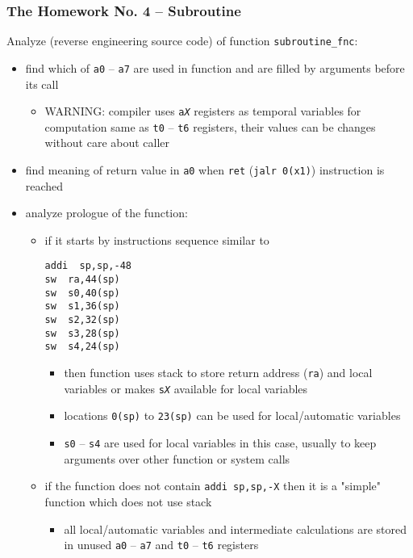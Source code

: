 \documentclass{beamer}
\begin{document}
\begin{frame}[fragile,shrink=20]
\frametitle{The Homework No. 4 -- Subroutine}

Analyze (reverse engineering source code) of function \texttt{subroutine\_fnc}:
\begin{itemize}
\item find which of \texttt{a0} -- \texttt{a7} are used in function and are filled by arguments before its call
 \begin{itemize}
 \item WARNING: compiler uses \texttt{a\textit{X}} registers as temporal variables for computation same as \texttt{t0} -- \texttt{t6} registers, their values can be changes without care about caller
 \end{itemize}
\item find meaning of return value in \texttt{a0} when \texttt{ret} (\texttt{jalr 0(x1)}) instruction is reached
\item analyze prologue of the function:
 \begin{itemize}
 \item if it starts by instructions sequence similar to
\begin{verbatim}
addi  sp,sp,-48
sw  ra,44(sp)
sw  s0,40(sp)
sw  s1,36(sp)
sw  s2,32(sp)
sw  s3,28(sp)
sw  s4,24(sp)
\end{verbatim}
\begin{itemize}
 \item then function uses stack to store return address (\texttt{ra}) and local variables or makes \texttt{s\textit{X}} available for local variables
 \item locations \texttt{0(sp)} to \texttt{23(sp)} can be used for local/automatic variables
 \item \texttt{s0} -- \texttt{s4} are used for local variables in this case, usually to keep arguments over other function or system calls
 \end{itemize}
 \item if the function does not contain \texttt{addi sp,sp,-X} then it is a "simple" function which does not use stack
\begin{itemize}
 \item all local/automatic variables and intermediate calculations are stored in unused \texttt{a0} -- \texttt{a7} and \texttt{t0} -- \texttt{t6} registers
 \end{itemize}
 \end{itemize}
 \end{itemize}
\end{frame}
\end{document}
